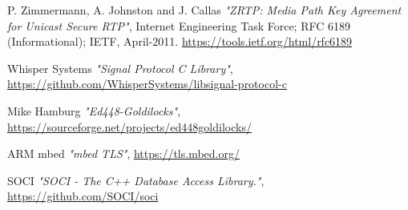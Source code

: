 \documentclass[a4paper,11pt]{article}
\begin{document}
\begin{thebibliography}{99}
  P. Zimmermann, A. Johnston and J. Callas
  \textit{\:"ZRTP: Media Path Key Agreement for Unicast Secure RTP"},
  Internet Engineering Task Force; RFC 6189 (Informational); IETF, April-2011.
  \href{https://tools.ietf.org/html/rfc6189}{https://tools.ietf.org/html/rfc6189}

  Whisper Systems
  \textit{\:"Signal Protocol C Library"},
  \href{https://github.com/WhisperSystems/libsignal-protocol-c}{https://github.com/WhisperSystems/libsignal-protocol-c}

  Mike Hamburg
  \textit{\:"Ed448-Goldilocks"},
  \href{https://sourceforge.net/projects/ed448goldilocks/}{https://sourceforge.net/projects/ed448goldilocks/}
  
  ARM mbed
  \textit{\:"mbed TLS"},
  \href{https://tls.mbed.org/}{https://tls.mbed.org/}
  
  SOCI
  \textit{\:"SOCI - The C++ Database Access Library."},
  \href{https://github.com/SOCI/soci}{https://github.com/SOCI/soci}
\end{thebibliography}
\end{document}
